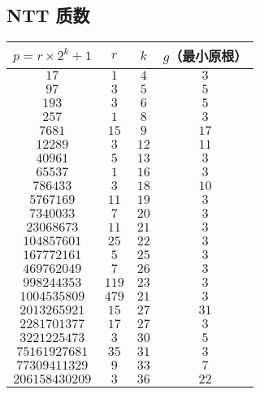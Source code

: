 \documentclass[12pt]{ctexart}
\begin{document}
\subsection{NTT 质数}
\begin{table}[H]
	\centering
	\begin{tabular}{c|c|c|c}

		\toprule
		$p=r\times 2^k+1$     & $r$   & $k$  & $g$（最小原根） \\
		\midrule
		$17$                  & $1$   & $4$  & $3$       \\
		$97$                  & $3$   & $5$  & $5$       \\
		$193$                 & $3$   & $6$  & $5$       \\
		$257$                 & $1$   & $8$  & $3$       \\
		$7681$                & $15$  & $9$  & $17$      \\
		$12289$               & $3$   & $12$ & $11$      \\
		$40961$               & $5$   & $13$ & $3$       \\
		$65537$               & $1$   & $16$ & $3$       \\
		$786433$              & $3$   & $18$ & $10$      \\
		$5767169$             & $11$  & $19$ & $3$       \\
		$7340033$             & $7$   & $20$ & $3$       \\
		$23068673$            & $11$  & $21$ & $3$       \\
		$104857601$           & $25$  & $22$ & $3$       \\
		$167772161$           & $5$   & $25$ & $3$       \\
		$469762049$           & $7$   & $26$ & $3$       \\
		$998244353$           & $119$ & $23$ & $3$       \\
		$1004535809$          & $479$ & $21$ & $3$       \\
		$2013265921$          & $15$  & $27$ & $31$      \\
		$2281701377$          & $17$  & $27$ & $3$       \\
		$3221225473$          & $3$   & $30$ & $5$       \\
		$75161927681$         & $35$  & $31$ & $3$       \\
		$77309411329$         & $9$   & $33$ & $7$       \\
		$206158430209$        & $3$   & $36$ & $22$      \\

\end{tabular}
\end{table}
\end{document}
